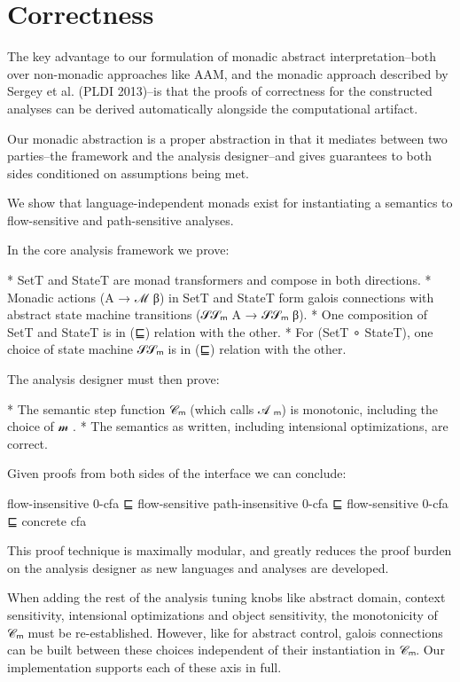 \documentclass{article}
\begin{document}



\section{Correctness}
\label{section:Correctness}

The key advantage to our formulation of monadic abstract interpretation--both
over non-monadic approaches like AAM, and the monadic approach described by
Sergey et al. (PLDI 2013)--is that the proofs of correctness for the
constructed analyses can be derived automatically alongside the computational
artifact.

Our monadic abstraction is a proper abstraction in that it mediates between two
parties--the framework and the analysis designer--and gives guarantees to both
sides conditioned on assumptions being met.

We show that language-independent monads exist for instantiating a semantics to
flow-sensitive and path-sensitive analyses.

In the core analysis framework we prove:

* SetT and StateT are monad transformers and compose in both directions.
* Monadic actions (A → ℳ  β) in SetT and StateT form galois connections with
  abstract state machine transitions (𝒮𝒮ₘ A → 𝒮𝒮ₘ β).
* One composition of SetT and StateT is in (⊑) relation with the other.
* For (SetT ∘ StateT), one choice of state machine 𝒮𝒮ₘ is in (⊑) relation with
  the other.

The analysis designer must then prove:

* The semantic step function 𝒞ₘ (which calls 𝒜 ₘ) is monotonic, including the
  choice of 𝓂 .
* The semantics as written, including intensional optimizations, are correct.

Given proofs from both sides of the interface we can conclude:

flow-insensitive 0-cfa 
 ⊑ 
flow-sensitive path-insensitive 0-cfa 
 ⊑ 
flow-sensitive 0-cfa
 ⊑ 
concrete cfa

This proof technique is maximally modular, and greatly reduces the proof burden
on the analysis designer as new languages and analyses are developed.

When adding the rest of the analysis tuning knobs like abstract domain, context
sensitivity, intensional optimizations and object sensitivity, the monotonicity
of 𝒞ₘ must be re-established.  However, like for abstract control, galois
connections can be built between these choices independent of their
instantiation in 𝒞ₘ. Our implementation supports each of these axis in full.
\end{document}

